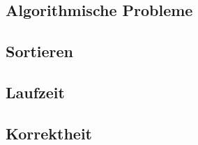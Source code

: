 \subsection{Algorithmische Probleme}

\subsection{Sortieren}

\subsection{Laufzeit}

\subsection{Korrektheit}